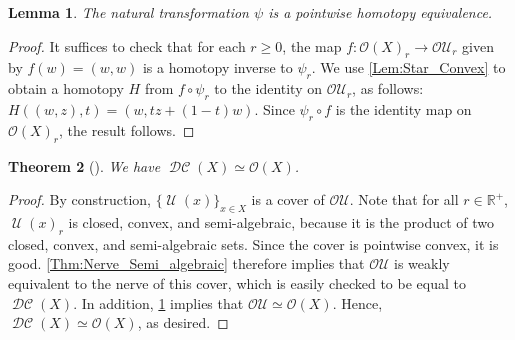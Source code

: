 \documentclass[11pt]{amsart}
\newcommand{\R}{\mathbb{R}} %
\DeclareMathOperator{\TelVO}{\mathcal U}
\DeclareMathOperator{\DelCech}{\mathcal{DC}}
\newcommand{\Offset}[0]{\mathcal{O}}
\theoremstyle{plain}
\newtheorem{theorem}{Theorem}[section]
\newtheorem{lemma}[theorem]{Lemma}
\theoremstyle{definition}
\theoremstyle{remark}
\begin{document}
%
\begin{lemma}\label{Lem:PRojection_H_E_1_Parameter}
The natural transformation $\psi$ is a pointwise homotopy equivalence.
\end{lemma}
%
\begin{proof}
It suffices to check that for each $r\geq 0$, the map $f\colon  \Offset(X)_r\to \mathcal{OU}_r$ given by $f(w)=(w,w)$ is a homotopy inverse to $\psi_r$.   We use \cref{Lem:Star_Convex} to obtain a homotopy $H$ from $f\circ \psi_r$ to the identity on $\mathcal{OU}_r$, as follows: $H((w,z),t)=(w,tz+(1-t)w)$.  Since $\psi_r\circ f$ is the identity map on $\Offset(X)_r$, the result follows.
\end{proof}
%
\begin{theorem}[\cite{bauer2017morse,blaser2022relative}]\label{Thm:1_Param_Weak_Equiv}
We have $\DelCech(X)\simeq \Offset(X)$.
\end{theorem}
\begin{proof}
By construction,  $\{\TelVO(x)\}_{x\in X}$ is a cover of $\mathcal{OU}$.  Note that for all $r\in \R^{+}$, $\TelVO(x)_r$ is closed, convex, and semi-algebraic, because it is the product of two closed, convex, and semi-algebraic sets.  Since the cover is pointwise convex, it is good. \cref{Thm:Nerve_Semi_algebraic} therefore implies that $\mathcal{OU}$ is weakly equivalent to the nerve of this cover, which is easily checked to be equal to $\DelCech(X)$.  In addition, \cref{Lem:PRojection_H_E_1_Parameter} implies that $\mathcal{OU} \simeq \Offset(X)$.  Hence, $\DelCech(X)\simeq\Offset(X)$, as desired.
\end{proof}
%
\end{document}
